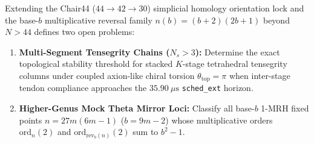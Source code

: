 \documentclass[aps,prl,twocolumn,superscriptaddress,10pt]{revtex4-2}
\begin{document}
Extending the Chair44 ($44 \to 42 \to 30$) simplicial homology orientation lock and the base-$b$ multiplicative reversal family $n(b) = (b+2)(2b+1)$ beyond $N > 44$ defines two open problems:
\begin{enumerate}
\item \textbf{Multi-Segment Tensegrity Chains ($N_s > 3$):} Determine the exact topological stability threshold for stacked $K$-stage tetrahedral tensegrity columns under coupled axion-like chiral torsion $\theta_{\text{top}} = \pi$ \cite{Wilczek1987} when inter-stage tendon compliance approaches the $35.90\ \mu\text{s}$ \texttt{sched\_ext} horizon.
\item \textbf{Higher-Genus Mock Theta Mirror Loci:} Classify all base-$b$ 1-MRH fixed points $n = 27m(6m-1)$ ($b = 9m-2$) whose multiplicative orders $\text{ord}_n(2)$ and $\text{ord}_{\text{rev}_b(n)}(2)$ sum to $b^2 - 1$.
\end{enumerate}



\end{document}
